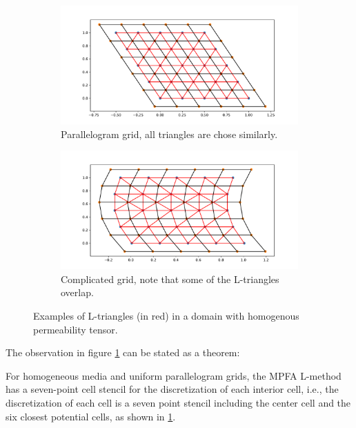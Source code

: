 \documentclass[../Main/main.tex]{subfiles}
\begin{document}
	\begin{figure}[H]
		\centering
		\begin{subfigure}[b]{0.8\textwidth}
			\centering
			\includegraphics[width=\textwidth]{L-triangles_paralellogram.pdf}
			\caption{Parallelogram grid, all triangles are chose similarly.}
			\label{fig:paralellogram-L}
		\end{subfigure}
		\hfill
		\begin{subfigure}[b]{0.8\textwidth}
			\centering
			\includegraphics[width=\textwidth]{L-triangles_complex.pdf}
			\caption{Complicated grid, note that some of the L-triangles overlap.}
			\label{fig:complicated-L}
		\end{subfigure}
		\caption{Examples of L-triangles (in red) in a domain with homogenous permeability tensor.}
		\label{fig:L-triangles}
	\end{figure}
	The observation in figure \ref{fig:paralellogram-L} can be stated as a theorem:
	\begin{theorem}
		\label{th:L_triangulation}
		For homogeneous media and uniform parallelogram grids, the MPFA L-method
		has a seven-point cell stencil for the discretization of each interior cell, i.e., the discretization of each cell is a seven point stencil including the center cell and the six closest potential cells, as shown in \ref{fig:paralellogram-L}.
	\end{theorem}
\end{document}
